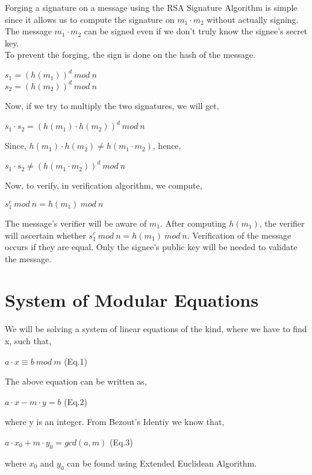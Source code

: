 \documentclass[11pt]{article}
\begin{document}
\newline
Forging a signature on a message using the RSA Signature Algorithm is simple since it allows us to compute the signature on $m_1 \cdot m_2$ without actually signing. The message $m_1 \cdot m_2$ can be signed even if we don't truly know the signee's secret key.\\
\newline
To prevent the forging, the sign is done on the hash of the message.
\begin{center}
    $s_1 = {(h(m_1))}^d \ mod \ n$\\
    $s_2 = {(h(m_2))}^d \ mod \ n$
\end{center}
Now, if we try to multiply the two signatures, we will get,
\begin{center}
    $s_1 \cdot s_2 = {(h(m_1) \cdot h(m_2))}^d \ mod \ n$
\end{center}
Since, $h(m_1) \cdot h(m_2) \neq h(m_1 \cdot m_2)$, hence, 
\begin{center}
    $s_1 \cdot s_2 \neq {(h(m_1 \cdot m_2))}^d \ mod \ n$
\end{center}
Now, to verify, in verification algorithm, we compute,
\begin{center}
    $s_1^e \ mod \ n = h(m_1) \ mod \ n$
\end{center}
The message's verifier will be aware of $m_1$. After computing $h(m_1)$, the verifier will ascertain whether $s_1^e \ mod \ n = h(m_1) \ mod \ n$. Verification of the message occurs if they are equal. Only the signee's public key will be needed to validate the message.

\section{System of Modular Equations}
We will be solving a system of linear equations of the kind, where we have to find x, such that,
\begin{center}
    $a \cdot x \equiv b \ mod \ m$    (Eq.1)
\end{center}
 The above equation can be written as,
\begin{center}
    $a \cdot x - m \cdot y = b$     (Eq.2)
\end{center}
where y is an integer. From Bezout's Identiy we know that, 
\begin{center}
    $a \cdot x_0 + m \cdot y_0 = gcd(a, m)$    (Eq.3)
\end{center}
where $x_0$ and $y_0$ can be found using Extended Euclidean Algorithm.
\end{document}
